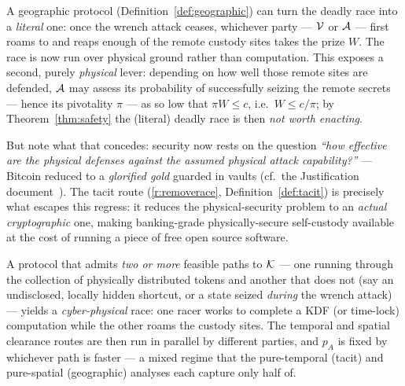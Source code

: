 \begin{remark}\label{rem:literalrace}
A geographic protocol (Definition~\ref{def:geographic}) can turn the deadly race
into a \emph{literal} one: once the wrench attack ceases, whichever party ---
$\mathcal{V}$ or $\mathcal{A}$ --- first roams to and reaps enough of the remote custody
sites takes the prize $W$. The race is now run over physical ground rather than
computation. This exposes a second, purely \emph{physical} lever: depending on how
well those remote sites are defended, $\mathcal{A}$ may assess its probability of
successfully seizing the remote secrets --- hence its pivotality $\pi$ --- as so
low that $\pi W \le c$, i.e.\ $W \le c/\pi$; by Theorem~\ref{thm:safety} the
(literal) deadly race is then \emph{not worth enacting}.
\end{remark}

\begin{remark}\label{rem:physical-to-crypto}
But note what that concedes: security now rests on the question \emph{``how
effective are the physical defenses against the assumed physical attack
capability?''} --- Bitcoin reduced to a \emph{glorified gold} guarded in vaults
(cf.\ the Justification document~\cite{gw-justification}). The tacit route (\ref{r:removerace}, Definition~\ref{def:tacit})
is precisely what escapes this regress: it reduces the physical-security problem to
an \emph{actual cryptographic} one, making banking-grade physically-secure
self-custody available at the cost of running a piece of free open source software.
\end{remark}

\begin{remark}\label{rem:cyberphysical}
A protocol that admits \emph{two or more} feasible paths to $\mathcal{K}$ --- one running
through the collection of physically distributed tokens and another that does not
(say an undisclosed, locally hidden shortcut, or a state seized \emph{during} the
wrench attack) --- yields a \emph{cyber-physical} race: one racer works to complete
a KDF (or time-lock) computation while the other roams the custody sites. The
temporal and spatial clearance routes are then run in parallel by different
parties, and $p_A$ is fixed by whichever path is faster --- a mixed regime that the
pure-temporal (tacit) and pure-spatial (geographic) analyses each capture only half
of.
\end{remark}

